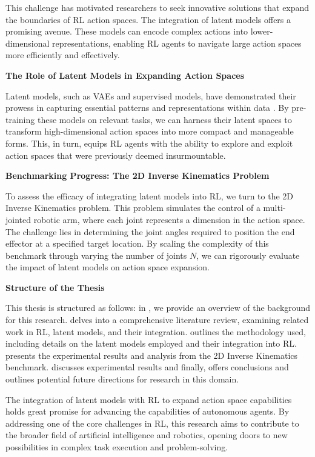 This challenge has motivated researchers to seek innovative solutions that expand the boundaries of RL action spaces. The integration of latent models offers a promising avenue. These models can encode complex actions into lower-dimensional representations, enabling RL agents to navigate large action spaces more efficiently and effectively.

\textbf{The Role of Latent Models in Expanding Action Spaces}

Latent models, such as VAEs and supervised models, have demonstrated their prowess in capturing essential patterns and representations within data \cite{pml2Book}. By pre-training these models on relevant tasks, we can harness their latent spaces to transform high-dimensional action spaces into more compact and manageable forms. This, in turn, equips RL agents with the ability to explore and exploit action spaces that were previously deemed insurmountable.

\textbf{Benchmarking Progress: The 2D Inverse Kinematics Problem}

To assess the efficacy of integrating latent models into RL, we turn to the 2D Inverse Kinematics problem. This problem simulates the control of a multi-jointed robotic arm, where each joint represents a dimension in the action space. The challenge lies in determining the joint angles required to position the end effector at a specified target location. By scaling the complexity of this benchmark through varying the number of joints $N$, we can rigorously evaluate the impact of latent models on action space expansion.

\textbf{Structure of the Thesis}

This thesis is structured as follows: in , we provide an overview of the background for this research.  delves into a comprehensive literature review, examining related work in RL, latent models, and their integration.  outlines the methodology used, including details on the latent models employed and their integration into RL.  presents the experimental results and analysis from the 2D Inverse Kinematics benchmark.  discusses experimental results and finally,  offers conclusions and outlines potential future directions for research in this domain.

The integration of latent models with RL to expand action space capabilities holds great promise for advancing the capabilities of autonomous agents. By addressing one of the core challenges in RL, this research aims to contribute to the broader field of artificial intelligence and robotics, opening doors to new possibilities in complex task execution and problem-solving.




